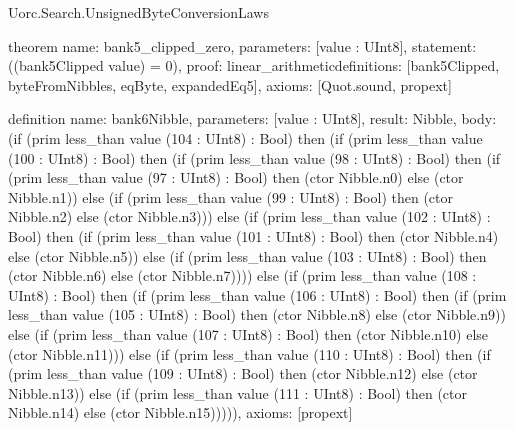 \begin{lexlean}{Uorc.Search.UnsignedByteConversionLaws}
\begin{semanticmodule}
theorem{
  name: bank5_clipped_zero,
  parameters: [value : UInt8],
  statement: ((bank5Clipped value) = 0),
  proof: linear_arithmetic{definitions: [bank5Clipped, byteFromNibbles, eqByte, expandedEq5]},
  axioms: [Quot.sound, propext]
}

definition{
  name: bank6Nibble,
  parameters: [value : UInt8],
  result: Nibble,
  body: (if (prim less_than value (104 : UInt8) : Bool) then (if (prim less_than value (100 : UInt8) : Bool) then (if (prim less_than value (98 : UInt8) : Bool) then (if (prim less_than value (97 : UInt8) : Bool) then (ctor Nibble.n0) else (ctor Nibble.n1)) else (if (prim less_than value (99 : UInt8) : Bool) then (ctor Nibble.n2) else (ctor Nibble.n3))) else (if (prim less_than value (102 : UInt8) : Bool) then (if (prim less_than value (101 : UInt8) : Bool) then (ctor Nibble.n4) else (ctor Nibble.n5)) else (if (prim less_than value (103 : UInt8) : Bool) then (ctor Nibble.n6) else (ctor Nibble.n7)))) else (if (prim less_than value (108 : UInt8) : Bool) then (if (prim less_than value (106 : UInt8) : Bool) then (if (prim less_than value (105 : UInt8) : Bool) then (ctor Nibble.n8) else (ctor Nibble.n9)) else (if (prim less_than value (107 : UInt8) : Bool) then (ctor Nibble.n10) else (ctor Nibble.n11))) else (if (prim less_than value (110 : UInt8) : Bool) then (if (prim less_than value (109 : UInt8) : Bool) then (ctor Nibble.n12) else (ctor Nibble.n13)) else (if (prim less_than value (111 : UInt8) : Bool) then (ctor Nibble.n14) else (ctor Nibble.n15))))),
  axioms: [propext]
}


\end{semanticmodule}
\end{lexlean}
